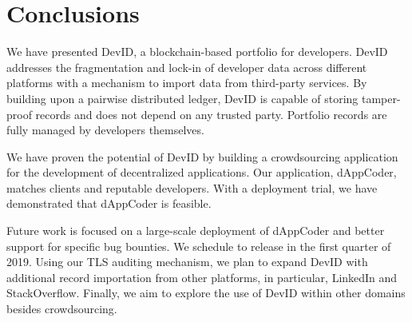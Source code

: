 \section{Conclusions}
We have presented DevID, a blockchain-based portfolio for developers.
DevID addresses the fragmentation and lock-in of developer data across different platforms with a mechanism to import data from third-party services.
By building upon a pairwise distributed ledger, DevID is capable of storing tamper-proof records and does not depend on any trusted party.
Portfolio records are fully managed by developers themselves.

We have proven the potential of DevID by building a crowdsourcing application for the development of decentralized applications.
Our application, dAppCoder, matches clients and reputable developers.
With a deployment trial, we have demonstrated that dAppCoder is feasible.

Future work is focused on a large-scale deployment of dAppCoder and better support for specific bug bounties.
We schedule to release in the first quarter of 2019.
Using our TLS auditing mechanism, we plan to expand DevID with additional record importation from other platforms, in particular, LinkedIn and StackOverflow.
Finally, we aim to explore the use of DevID within other domains besides crowdsourcing.